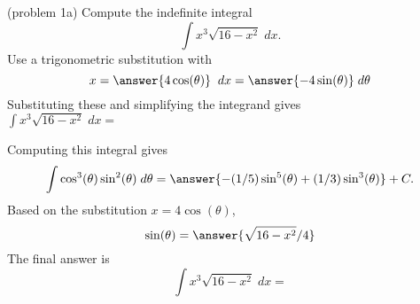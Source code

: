 \documentclass{ximera}
\begin{document}
\begin{problem}(problem 1a)
Compute the indefinite integral
\[
\int   x^3 \sqrt{16-x^2} \; dx.
\]
Use a trigonometric substitution with\\
\[
x = \answer{4\cos(\theta)} \;\; dx = \answer{-4\sin(\theta)} \; d\theta
\]
Substituting these and simplifying the integrand gives\\
$\displaystyle{\int  x^3 \sqrt{16 - x^2}\; dx =}$\\
\begin{multipleChoice}
\end{multipleChoice}

Computing this integral gives
\[
\int \cos^3(\theta)\sin^2(\theta) \; d\theta = \answer{-(1/5)\sin^5(\theta) + (1/3)\sin^3(\theta)} + C.
\]
Based on the substitution $x = 4\cos(\theta)$, \\
\[
\sin(\theta) = \answer{\sqrt{16 - x^2}/4}
\]
The final answer is
\[
\int   x^3\sqrt{16 -  x^2}\; dx = 
\]
\begin{center}
\begin{multipleChoice}
\end{multipleChoice}
\end{center}


\end{problem}
\end{document}
